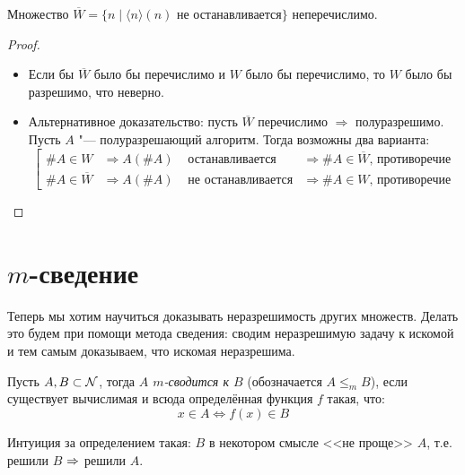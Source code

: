 \begin{conseq}
	 Множество $\overline{W} = \{n \mid \langle n\rangle(n)\text{~не останавливается}\}$ неперечислимо.
\end{conseq}
\begin{proof}
	\begin{itemize}
		\item
			Если бы $\overline{W}$ было бы перечислимо и $W$ было бы перечислимо, то $W$ было бы разрешимо, что неверно.
		\item
			Альтернативное доказательство: пусть $\overline{W}$ перечислимо $\Rightarrow$ полуразрешимо.
			Пусть $A$ "--- полуразрешающий алгоритм.
			Тогда возможны два варианта:
			\[\left[
				\begin{alignedat}{2}
				\#A \in W            &\Rightarrow A(\#A) &\text{~останавливается}    &\Rightarrow \#A \in \overline{W}\text{, противоречие} \\
				\#A \in \overline{W} &\Rightarrow A(\#A) &\text{~не останавливается} &\Rightarrow \#A \in W           \text{, противоречие}
				\end{alignedat}
			\right.\]
	\end{itemize}
\end{proof}

\section{\texorpdfstring{$m$}{m}-сведение}
Теперь мы хотим научиться доказывать неразрешимость других множеств.
Делать это будем при помощи метода сведения: сводим неразрешимую задачу к искомой и тем самым доказываем, что искомая неразрешима.

\begin{Def}
	Пусть $A, B \subset \mathcal{N}$, тогда \textit{$A$ $m$-сводится к $B$} (обозначается $A \le_m B$),
	если существует вычислимая и всюда определённая функция $f$ такая, что:
	\[ x \in A \iff f(x) \in B \]
\end{Def}
\begin{Rem}
	Интуиция за определением такая: $B$ в некотором смысле <<не проще>> $A$, т.е. решили $B$ $\Rightarrow$ решили $A$.
\end{Rem}

